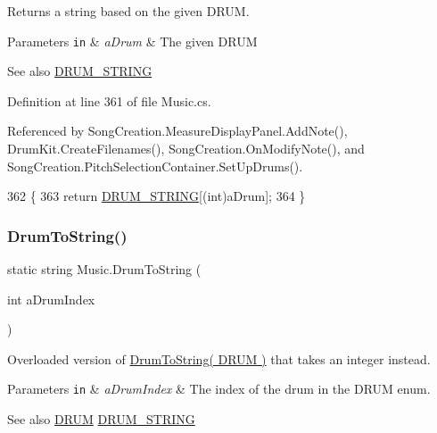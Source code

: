 Returns a string based on the given D\+R\+UM. 


\begin{DoxyParams}[1]{Parameters}
\mbox{\tt in}  & {\em a\+Drum} & The given D\+R\+UM\\
\hline
\end{DoxyParams}
\begin{DoxySeeAlso}{See also}
\hyperlink{group___music_constants_ga1381281d147886a2cf3584ab0c7a67d6}{D\+R\+U\+M\+\_\+\+S\+T\+R\+I\+NG} 
\end{DoxySeeAlso}


Definition at line 361 of file Music.\+cs.



Referenced by Song\+Creation.\+Measure\+Display\+Panel.\+Add\+Note(), Drum\+Kit.\+Create\+Filenames(), Song\+Creation.\+On\+Modify\+Note(), and Song\+Creation.\+Pitch\+Selection\+Container.\+Set\+Up\+Drums().


\begin{DoxyCode}
362     \{
363         \textcolor{keywordflow}{return} \hyperlink{group___music_constants_ga1381281d147886a2cf3584ab0c7a67d6}{DRUM\_STRING}[(int)aDrum];
364     \}
\end{DoxyCode}
\mbox{\label{group___music_static_func_gab74179676b93b41cde2d1cc18af0e788}} 
\subsubsection{\texorpdfstring{Drum\+To\+String()}{DrumToString()}\hspace{0.1cm}{\footnotesize\ttfamily [2/2]}}
{\footnotesize\ttfamily static string Music.\+Drum\+To\+String (\begin{DoxyParamCaption}\item[{int}]{a\+Drum\+Index }\end{DoxyParamCaption})\hspace{0.3cm}{\ttfamily [static]}}



Overloaded version of \hyperlink{group___music_static_func_gaf5f64ebe9a7e036e07f283e41f26d22b}{Drum\+To\+String( D\+R\+U\+M )} that takes an integer instead. 


\begin{DoxyParams}[1]{Parameters}
\mbox{\tt in}  & {\em a\+Drum\+Index} & The index of the drum in the D\+R\+UM enum.\\
\hline
\end{DoxyParams}
\begin{DoxySeeAlso}{See also}
\hyperlink{group___music_enums_gade475b4382c7066d1af13e7c13c029b6}{D\+R\+UM} \hyperlink{group___music_constants_ga1381281d147886a2cf3584ab0c7a67d6}{D\+R\+U\+M\+\_\+\+S\+T\+R\+I\+NG} 
\end{DoxySeeAlso}


